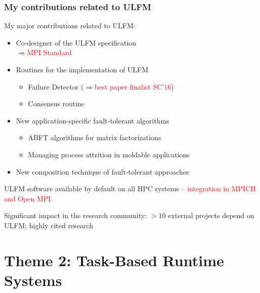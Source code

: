 \begin{frame}
  \frametitle{My contributions related to ULFM}
  
  My major contributions related to ULFM:
  \begin{itemize}
  \item Co-designer of the ULFM specification \\
    $\Longrightarrow$\textcolor{red}{MPI Standard}
  \item Routines for the implementation of ULFM
    \begin{itemize}
    \item Failure Detector ($\Rightarrow$\textcolor{red}{best paper finalist SC'16})
    \item Consensus routine 
    \end{itemize}
  \item New application-specific fault-tolerant algorithms
    \begin{itemize}
    \item ABFT algorithms for matrix factorizations
    \item Managing process attrition in moldable applications
    \end{itemize}
  \item New composition technique of fault-tolerant approaches
  \end{itemize}

  ULFM software available by default on all HPC systems -- \textcolor{red}{integration in MPICH and Open MPI}
  
  Significant impact in the research community: $>10$ external projects depend on ULFM; highly cited research
\end{frame}

\section[Task-Based Runtime Systems]{Theme 2: Task-Based Runtime Systems}

